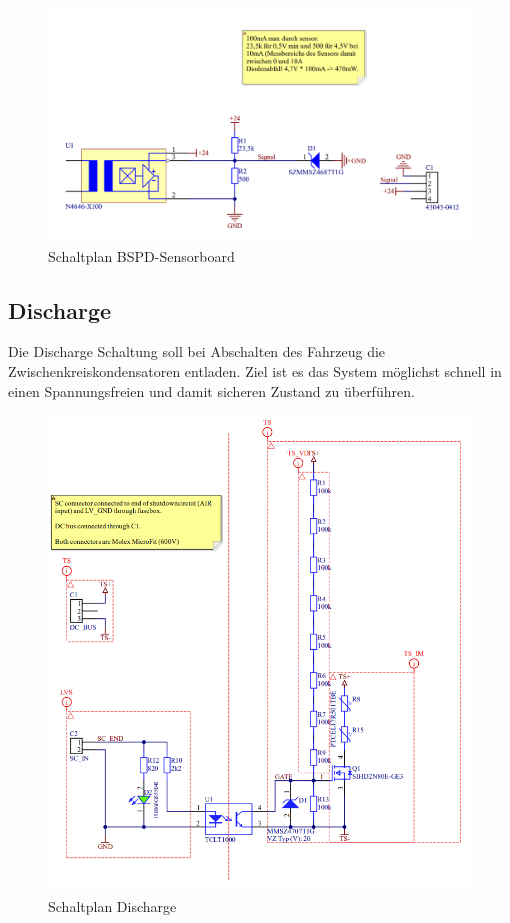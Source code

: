 \begin{figure}
	\centering
	\includegraphics[width=0.7\linewidth]{"bilder/Sensorboard Schaltung"}
	\caption{Schaltplan \ac{BSPD}-Sensorboard}
	\label{fig:sensorboard-schaltung}
\end{figure}

\FloatBarrier
\subsection{Discharge}
Die Discharge Schaltung soll bei Abschalten des Fahrzeug die Zwischenkreiskondensatoren entladen. Ziel ist es das System möglichst schnell in einen Spannungsfreien und damit sicheren Zustand zu überführen.

\begin{figure}
	\centering
	\includegraphics[width=0.8\linewidth]{bilder/Discharge}
	\caption{Schaltplan Discharge}
	\label{fig:discharge}
\end{figure}

